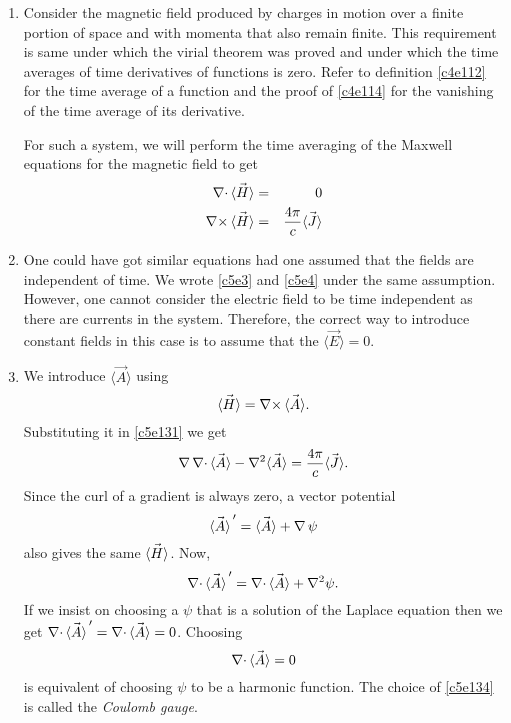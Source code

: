 \begin{enumerate}
\item Consider the magnetic field produced by charges in motion over a finite
portion of space and with momenta that also remain finite. This requirement is 
same under which the virial theorem was proved and under which the time averages
of time derivatives of functions is zero. Refer to definition \eqref{c4e112} 
for the time average of a function and the proof of \eqref{c4e114} for the 
vanishing of the time average of its derivative.

For such a system, we will perform the time averaging of the Maxwell equations
for the magnetic field to get
\begin{eqnarray}
\operatorname{\nabla\cdot}\vec{\left\langle{H}\right\rangle} &=& 0 \label{c5e130} \\
\operatorname{\nabla\times}\vec{\left\langle{H}\right\rangle} &=& \frac{4\pi}{c}\vec{\left\langle{J}\right\rangle} \label{c5e131}
\end{eqnarray}

\item One could have got similar equations had one assumed that the fields are
independent of time. We wrote \eqref{c5e3} and \eqref{c5e4} under the same 
assumption. However, one cannot consider the electric field to be time 
independent as there are currents in the system. Therefore, the correct way to 
introduce constant fields in this case is to assume that the $\langle\vec{E}
\rangle = 0$.

\item We introduce $\langle\vec{A}\rangle$ using
\begin{equation}\label{c5e132}
\vec{\left\langle{H}\right\rangle} = \operatorname{\nabla\times}\vec{\left\langle{A}\right\rangle}.
\end{equation}
Substituting it in \eqref{c5e131} we get
\begin{equation}\label{c5e133}
\operatorname{\nabla}\operatorname{\nabla\cdot}\vec{\left\langle{A}\right\rangle} - \nabla^2\vec{\left\langle{A}\right\rangle} = \frac{4\pi}{c}\vec{\left\langle{J}\right\rangle}.
\end{equation}
Since the curl of a gradient is always zero, a vector potential
\[
\vec{\left\langle{A}\right\rangle}^{\,\prime} = \vec{\left\langle{A}\right\rangle} + \operatorname{\nabla}\psi
\]
also gives the same $\vec{\left\langle{H}\right\rangle}$. Now,
\[
\operatorname{\nabla\cdot}\vec{\left\langle{A}\right\rangle}^{\,\prime} = \operatorname{\nabla\cdot}\vec{\left\langle{A}\right\rangle} + \nabla^2\psi.
\]
If we insist on choosing a $\psi$ that is a solution of the Laplace equation 
then we get $\operatorname{\nabla\cdot}\vec{\left\langle{A}\right\rangle}^{\,\prime} = \operatorname{\nabla\cdot}\vec{\left\langle{A}\right\rangle} = 0$. Choosing
\begin{equation}\label{c5e134}
\operatorname{\nabla\cdot}\vec{\left\langle{A}\right\rangle} = 0
\end{equation} is equivalent of choosing $\psi$ to be a harmonic function. The 
choice of \eqref{c5e134} is called the \emph{Coulomb gauge}.


\end{enumerate}
